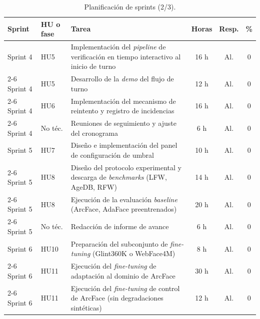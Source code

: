 \documentclass[
  11pt, %
]{charter}
\begin{document}
\begin{table}[htpb]
  \centering
  \caption{Planificación de sprints (2/3).}
  \begin{tabularx}{\linewidth}{@{}|l|X|X|c|c|c|@{}}
    \hline
    \rowcolor[HTML]{C0C0C0}
    Sprint & HU o fase & Tarea & Horas & Resp. & \% \\ \hline

    Sprint 4 & HU5 & Implementación del \textit{pipeline} de verificación en tiempo interactivo al inicio de turno & 16 h & Al. & 0 \\ \cline{2-6}
    Sprint 4 & HU5 & Desarrollo de la \textit{demo} del flujo de turno & 12 h & Al. & 0 \\ \cline{2-6}
    Sprint 4 & HU6 & Implementación del mecanismo de reintento y registro de incidencias & 16 h & Al. & 0 \\ \cline{2-6}
    Sprint 4 & No téc. & Reuniones de seguimiento y ajuste del cronograma & 6 h & Al. & 0 \\ \hline

    Sprint 5 & HU7 & Diseño e implementación del panel de configuración de umbral & 10 h & Al. & 0 \\ \cline{2-6}
    Sprint 5 & HU8 & Diseño del protocolo experimental y descarga de \textit{benchmarks} (LFW, AgeDB, RFW) & 14 h & Al. & 0 \\ \cline{2-6}
    Sprint 5 & HU8 & Ejecución de la evaluación \textit{baseline} (ArcFace, AdaFace preentrenados) & 20 h & Al. & 0 \\ \cline{2-6}
    Sprint 5 & No téc. & Redacción de informe de avance & 6 h & Al. & 0 \\ \hline

    Sprint 6 & HU10 & Preparación del subconjunto de \textit{fine-tuning} (Glint360K o WebFace4M) & 8 h & Al. & 0 \\ \cline{2-6}
    Sprint 6 & HU11 & Ejecución del \textit{fine-tuning} de adaptación al dominio de ArcFace & 30 h & Al. & 0 \\ \cline{2-6}
    Sprint 6 & HU11 & Ejecución del \textit{fine-tuning} de control de ArcFace (sin degradaciones sintéticas) & 12 h & Al. & 0 \\ \hline

  \end{tabularx}
\end{table}
\end{document}
